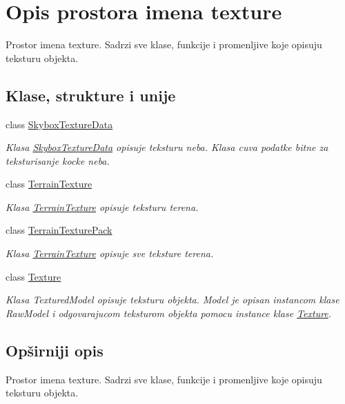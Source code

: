 \hypertarget{namespacetexture}{}\section{Opis prostora imena texture}
\label{namespacetexture}


Prostor imena texture. Sadrzi sve klase, funkcije i promenljive koje opisuju teksturu objekta.  


\subsection*{Klase, strukture i unije}
\begin{DoxyCompactItemize}
\item 
class \hyperlink{classtexture_1_1SkyboxTextureData}{Skybox\+Texture\+Data}
\begin{DoxyCompactList}\small\item\em Klasa \hyperlink{classtexture_1_1SkyboxTextureData}{Skybox\+Texture\+Data} opisuje teksturu neba. Klasa cuva podatke bitne za teksturisanje kocke neba. \end{DoxyCompactList}\item 
class \hyperlink{classtexture_1_1TerrainTexture}{Terrain\+Texture}
\begin{DoxyCompactList}\small\item\em Klasa \hyperlink{classtexture_1_1TerrainTexture}{Terrain\+Texture} opisuje teksturu terena. \end{DoxyCompactList}\item 
class \hyperlink{classtexture_1_1TerrainTexturePack}{Terrain\+Texture\+Pack}
\begin{DoxyCompactList}\small\item\em Klasa \hyperlink{classtexture_1_1TerrainTexture}{Terrain\+Texture} opisuje sve teksture terena. \end{DoxyCompactList}\item 
class \hyperlink{classtexture_1_1Texture}{Texture}
\begin{DoxyCompactList}\small\item\em Klasa Textured\+Model opisuje teksturu objekta. Model je opisan instancom klase Raw\+Model i odgovarajucom teksturom objekta pomocu instance klase \hyperlink{classtexture_1_1Texture}{Texture}. \end{DoxyCompactList}\end{DoxyCompactItemize}


\subsection{Opširniji opis}
Prostor imena texture. Sadrzi sve klase, funkcije i promenljive koje opisuju teksturu objekta. 